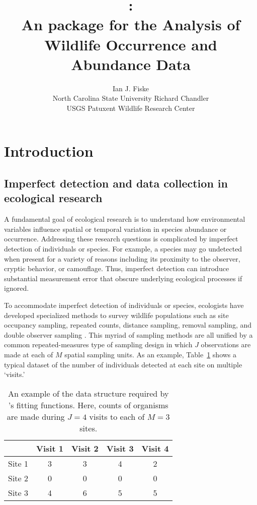 \documentclass[article,shortnames]{jss}
\author{Ian J. Fiske\\North Carolina State University \And
  Richard Chandler\\ USGS Patuxent Wildlife Research Center}
\title{\pkg{unmarked}:\\
  An \proglang{R} package for the Analysis of Wildlife Occurrence and Abundance Data}
\newcommand{\um}{\pkg{unmarked}}
\begin{document}
\section{Introduction}


\subsection{Imperfect detection and data collection in ecological research}

A fundamental goal of ecological research is to understand how environmental 
variables influence spatial or temporal variation in species abundance or 
occurrence.  Addressing these research questions is complicated by imperfect 
detection of individuals or species.  For example, a species may go 
undetected when present for a variety of reasons including its proximity to 
the observer, cryptic behavior, or camouflage. Thus, imperfect detection 
can introduce substantial measurement error that obscure underlying 
ecological processes if ignored. 

To accommodate imperfect detection of individuals or species, 
ecologists have developed specialized methods to survey wildlife 
populations such as site occupancy sampling, repeated counts, 
distance sampling, removal sampling, and double observer sampling 
\citetext{see Section~\ref{sec:models-impl-unmark} and 
\citep{WilliamsEA2002} for definitions}.  This myriad of sampling methods 
are all unified by a common repeated-measures type of sampling design in 
which $J$ observations are made at each of $M$ spatial sampling 
units. As an example, Table~\ref{tab:exdata} shows a typical dataset 
of the number of individuals detected at each site on multiple `visits.' 

\begin{table}[h!] %
\begin{centering}
\begin{tabular}{lcccc}
\hline
          & Visit 1   & Visit 2   & Visit 3   & Visit 4 \\
\hline
Site 1    & 3         & 3         & 4        & 2 \\
Site 2    & 0         & 0         & 0        & 0 \\
Site 3    & 4         & 6         & 5        & 5 \\
\hline
\end{tabular}
\caption{An example of the data structure required by \um's fitting functions. 
Here, counts of organisms are made during $J=4$ visits to each of $M=3$ sites.}
\end{centering}
\label{tab:exdata}
\end{table}
\end{document}
